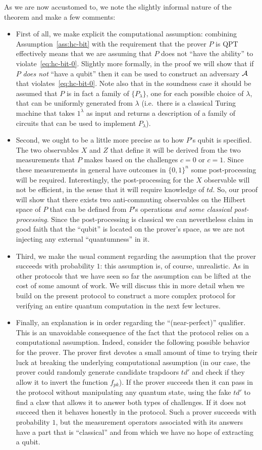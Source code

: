 As we are now accustomed to, we note the slightly informal nature of the theorem and make a few comments:
\begin{itemize}
\item First of all, we make explicit the computational assumption: combining Assumption~\ref{ass:hc-bit} with the requirement that the prover $P$ is QPT effectively means that we are assuming that $P$ does not ``have the ability'' to violate~\eqref{eq:hc-bit-0}. Slightly more formally, in the proof we will show that if $P$ \emph{does not} ``have a qubit'' then it can be used to construct an adversary $\mathcal{A}$ that violates~\eqref{eq:hc-bit-0}. Note also that in the soundness case it should be assumed that $P$ is in fact a family of $\{P_\lambda\}$, one for each possible choice of $\lambda$, that can be uniformly generated from $\lambda$ (i.e.\ there is a classical Turing machine that takes $1^\lambda$ as input and returns a description of a family of circuits that can be used to implement $P_\lambda$). 
\item
Second, we ought to be a little more precise as to how $P$'s qubit is specified. The two observables $X$ and $Z$ that define it will be derived from the two measurements that $P$ makes based on the challenges $c=0$ or $c=1$. Since these measurements in general have outcomes in $\{0,1\}^n$ some post-processing will be required. Interestingly, the post-processing for the $X$ observable will not be efficient, in the sense that it will require knowledge of $td$. So, our proof will show that there exists two anti-commuting observables on the Hilbert space of $P$ that can be defined from $P$'s operations \emph{and some classical post-processing}. Since the post-processing is classical we can nevertheless claim in good faith that the ``qubit'' is located on the prover's space, as we are not injecting any external ``quantumness'' in it. 
\item
Third, we make the usual comment regarding the assumption that the prover succeeds with probability $1$: this assumption is, of course, unrealistic. As in other protocols that we have seen so far the assumption can be lifted at the cost of some amount of work. We will discuss this in more detail when we build on the present protocol to construct a more complex protocol for verifying an entire quantum computation in the next few lectures. 
\item
Finally, an explanation is in order regarding the ``(near-perfect)'' qualifier. This is an unavoidable consequence of the fact that the protocol relies on a computational assumption. Indeed, consider the following possible behavior for the prover. The prover first devotes a small amount of time to trying their luck at breaking the underlying computational assumption (in our case, the prover could randomly generate candidate trapdoors $td'$ and check if they allow it to invert the function $f_{pk}$). If the prover succeeds then it can pass in the protocol without manipulating any quantum state, using the fake $td'$ to find a claw that allows it to answer both types of challenges. If it does not succeed then it behaves honestly in the protocol. Such a prover succeeds with probability $1$, but the measurement operators associated with its answers have a part that is ``classical'' and from which we have no hope of extracting a qubit. 

\end{itemize}
